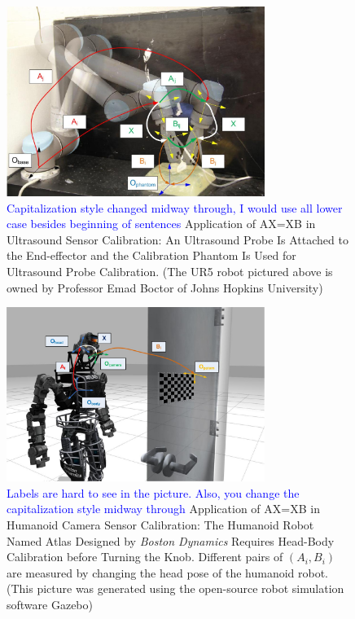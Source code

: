 \documentclass[twocolumn,10pt]{asme2ej}
\begin{document}
\begin{figure}[t]
\centering
\includegraphics[width=3.3in]{Photos/UR5_Frame_Final.jpg}
\caption{\textcolor{blue}{Capitalization style changed midway through, I would use all lower case besides beginning of sentences} Application of AX=XB in Ultrasound Sensor Calibration: An Ultrasound Probe Is Attached to the End-effector and the Calibration Phantom Is Used for Ultrasound Probe Calibration. (The UR5 robot pictured above is owned by Professor Emad Boctor of Johns Hopkins University)}
\label{AXXBfig2}
\end{figure}

\begin{figure}[t]
\centering
\includegraphics[width=3.3in]{Photos/Robot_Patern.jpg}
\caption{\textcolor{blue}{Labels are hard to see in the picture. Also, you change the capitalization style midway through} Application of AX=XB in Humanoid Camera Sensor Calibration: The Humanoid Robot Named Atlas Designed by %
 \textit{Boston Dynamics} Requires Head-Body Calibration before Turning the Knob. Different pairs of $(A_i, B_i)$ are measured by changing the head pose of the humanoid robot. (This picture was generated using the open-source robot simulation software Gazebo)}
\label{AXXBfig3}
\end{figure}
\end{document}
